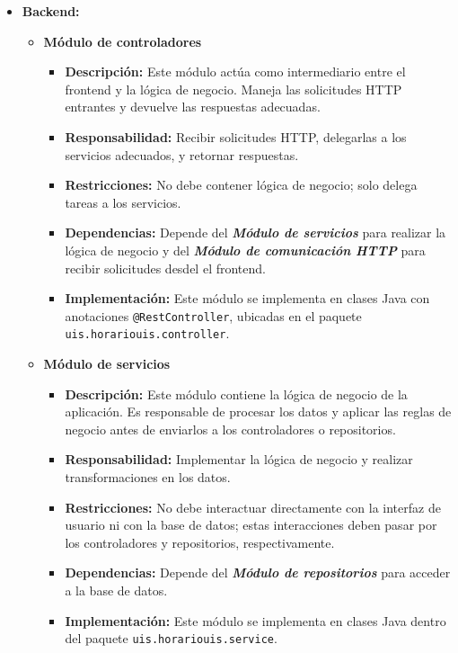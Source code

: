 \documentclass{article} %
\begin{document}
\begin{itemize}
        \item \textbf{Backend:} 
        \begin{itemize}
            \item \textbf{Módulo de controladores}
            \begin{itemize}
                \item \textbf{Descripción:} Este módulo actúa como intermediario entre el frontend y la lógica de negocio. Maneja las solicitudes HTTP entrantes y devuelve las respuestas adecuadas.
                \item \textbf{Responsabilidad:} Recibir solicitudes HTTP, delegarlas a los servicios adecuados, y retornar respuestas.
                \item \textbf{Restricciones:} No debe contener lógica de negocio; solo delega tareas a los servicios.
                \item \textbf{Dependencias:} Depende del \textbf{\emph{Módulo de servicios}} para realizar la lógica de negocio y del \textbf{\textit{Módulo de comunicación HTTP}} para recibir solicitudes desdel el frontend.
                \item \textbf{Implementación:} Este módulo se implementa en clases Java con anotaciones \texttt{@RestController}, ubicadas en el paquete \texttt{uis.horariouis.controller}.
            \end{itemize}
            
            \item \textbf{Módulo de servicios}
            \begin{itemize}
                \item \textbf{Descripción:} Este módulo contiene la lógica de negocio de la aplicación. Es responsable de procesar los datos y aplicar las reglas de negocio antes de enviarlos a los controladores o repositorios.
                \item \textbf{Responsabilidad:} Implementar la lógica de negocio y realizar transformaciones en los datos.
                \item \textbf{Restricciones:} No debe interactuar directamente con la interfaz de usuario ni con la base de datos; estas interacciones deben pasar por los controladores y repositorios, respectivamente.
                \item \textbf{Dependencias:} Depende del \textbf{\emph{Módulo de repositorios}} para acceder a la base de datos.
                \item \textbf{Implementación:} Este módulo se implementa en clases Java dentro del paquete \texttt{uis.horariouis.service}.
            \end{itemize}
            

\end{itemize}
\end{itemize}
\end{document}
